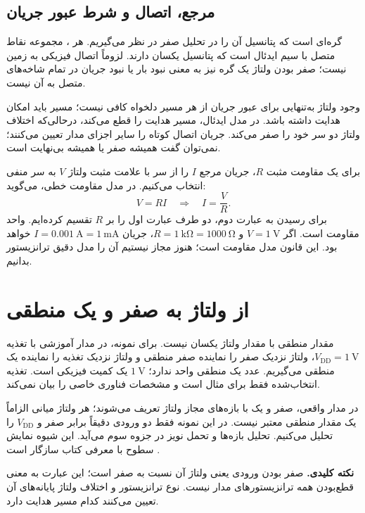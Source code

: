 \clearpage
\subsection{مرجع، اتصال و شرط عبور جریان}
 گره‌ای است که پتانسیل آن را در تحلیل صفر در نظر می‌گیریم.
هر ، مجموعه نقاط متصل با سیم ایدئال است که پتانسیل یکسان دارند.
 لزوماً اتصال فیزیکی به زمین نیست؛ صفر بودن ولتاژ یک گره نیز
به معنی نبود بار یا نبود جریان در تمام شاخه‌های متصل به آن نیست.

وجود ولتاژ به‌تنهایی برای عبور جریان از هر مسیر دلخواه کافی نیست؛ مسیر باید امکان
هدایت داشته باشد. در مدل ایدئال،  مسیر هدایت را قطع می‌کند،
درحالی‌که  اختلاف ولتاژ دو سر خود را صفر می‌کند.
جریان اتصال کوتاه را سایر اجزای مدار تعیین می‌کنند؛ نمی‌توان گفت همیشه صفر یا همیشه بی‌نهایت است.

برای یک مقاومت مثبت \(R\)، جریان مرجع \(I\) را از سر با علامت مثبت ولتاژ \(V\)
به سر منفی انتخاب می‌کنیم. در مدل مقاومت خطی،  می‌گوید:
\begin{equation}\label{eq:ohm}
V=RI\quad\Longrightarrow\quad I=\frac{V}{R}.
\end{equation}
برای رسیدن به عبارت دوم، دو طرف عبارت اول را بر \(R\) تقسیم کرده‌ایم.
واحد مقاومت  است. اگر \(V=\qty{1}{\volt}\) و
\(R=\qty{1}{\kilo\ohm}=\qty{1000}{\ohm}\)، جریان
\(I=\qty{0.001}{\ampere}=\qty{1}{\milli\ampere}\) خواهد بود.
این قانون مدل مقاومت است؛ هنوز مجاز نیستیم آن را مدل دقیق ترانزیستور بدانیم.

\section{از ولتاژ به صفر و یک منطقی}
مقدار منطقی با مقدار ولتاژ یکسان نیست. برای نمونه، در مدار آموزشی با تغذیه
\(V_{\mathrm{DD}}=\qty{1}{\volt}\)، ولتاژ نزدیک صفر را نماینده صفر منطقی و
ولتاژ نزدیک تغذیه را نماینده یک منطقی می‌گیریم.
عدد یک منطقی واحد ندارد؛ \(\qty{1}{\volt}\) یک کمیت فیزیکی است.
تغذیه انتخاب‌شده فقط برای مثال است و مشخصات فناوری خاصی را بیان نمی‌کند.

در مدار واقعی، صفر و یک با بازه‌های مجاز ولتاژ تعریف می‌شوند؛ هر ولتاژ میانی
الزاماً یک مقدار منطقی معتبر نیست. در این نمونه فقط دو ورودی دقیقاً برابر
صفر و \(V_{\mathrm{DD}}\) را تحلیل می‌کنیم. تحلیل بازه‌ها و تحمل نویز در جزوه سوم می‌آید.
این شیوه نمایش سطوح با معرفی کتاب سازگار است \cite[بخش ، صفحه چاپی ۸]{weste}.

\textbf{نکته کلیدی.} صفر بودن ورودی یعنی ولتاژ آن نسبت به  صفر است؛
این عبارت به معنی قطع‌بودن همه ترانزیستورهای مدار نیست. نوع ترانزیستور و اختلاف
ولتاژ پایانه‌های آن تعیین می‌کنند کدام مسیر هدایت دارد.

